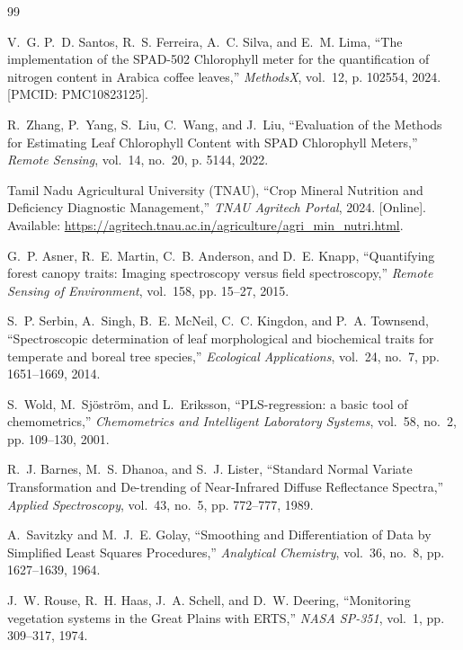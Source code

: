 \documentclass[9pt,twocolumn,a4paper,landscape]{article}
\begin{document}

\begin{thebibliography}{99}

V.~G. P.~D. Santos, R.~S. Ferreira, A.~C. Silva, and E.~M. Lima,
\newblock ``The implementation of the SPAD-502 Chlorophyll meter for the quantification of nitrogen content in Arabica coffee leaves,''
\newblock \emph{MethodsX}, vol.~12, p. 102554, 2024. [PMCID: PMC10823125].

R.~Zhang, P.~Yang, S.~Liu, C.~Wang, and J.~Liu,
\newblock ``Evaluation of the Methods for Estimating Leaf Chlorophyll Content with SPAD Chlorophyll Meters,''
\newblock \emph{Remote Sensing}, vol.~14, no.~20, p. 5144, 2022.

Tamil Nadu Agricultural University (TNAU),
\newblock ``Crop Mineral Nutrition and Deficiency Diagnostic Management,''
\newblock \emph{TNAU Agritech Portal}, 2024. [Online]. Available: \url{https://agritech.tnau.ac.in/agriculture/agri_min_nutri.html}.

G.~P. Asner, R.~E. Martin, C.~B. Anderson, and D.~E. Knapp,
\newblock ``Quantifying forest canopy traits: Imaging spectroscopy versus field spectroscopy,''
\newblock \emph{Remote Sensing of Environment}, vol.~158, pp. 15--27, 2015.

S.~P. Serbin, A.~Singh, B.~E. McNeil, C.~C. Kingdon, and P.~A. Townsend,
\newblock ``Spectroscopic determination of leaf morphological and biochemical traits for temperate and boreal tree species,''
\newblock \emph{Ecological Applications}, vol.~24, no.~7, pp. 1651--1669, 2014.

S.~Wold, M.~Sj{\"o}str{\"o}m, and L.~Eriksson,
\newblock ``PLS-regression: a basic tool of chemometrics,''
\newblock \emph{Chemometrics and Intelligent Laboratory Systems}, vol.~58, no.~2, pp. 109--130, 2001.

R.~J. Barnes, M.~S. Dhanoa, and S.~J. Lister,
\newblock ``Standard Normal Variate Transformation and De-trending of Near-Infrared Diffuse Reflectance Spectra,''
\newblock \emph{Applied Spectroscopy}, vol.~43, no.~5, pp. 772--777, 1989.

A.~Savitzky and M.~J.~E. Golay,
\newblock ``Smoothing and Differentiation of Data by Simplified Least Squares Procedures,''
\newblock \emph{Analytical Chemistry}, vol.~36, no.~8, pp. 1627--1639, 1964.

J.~W. Rouse, R.~H. Haas, J.~A. Schell, and D.~W. Deering,
\newblock ``Monitoring vegetation systems in the Great Plains with ERTS,''
\newblock \emph{NASA SP-351}, vol.~1, pp. 309--317, 1974.

\end{thebibliography}
\end{document}

